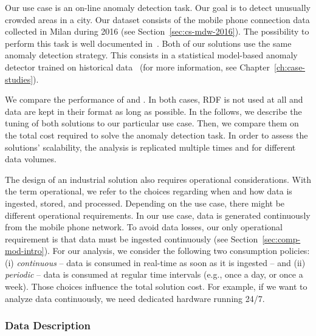 {Our use case is an on-line anomaly detection task. Our goal is to detect unusually crowded areas in a city. Our dataset consists of the mobile phone connection data collected in Milan during 2016 (see Section~\ref{sec:cs-mdw-2016}). The possibility to perform this task is well documented in~\cite{krings2009urban,calabrese2010geography,calabrese2011real}. Both of our solutions use the same anomaly detection strategy. This consists in a statistical model-based anomaly detector trained on historical data~\cite{DBLP:journals/ieeemm/BalduiniVALAC15} (for more information, see Chapter~\ref{ch:case-studies}). 

We compare the performance of \sparkdi{} and \sti{}.
In both cases, RDF is not used at all and data are kept in their format as long as possible.
In the follows, we describe the tuning of both solutions to our particular use case. Then, we compare them on the total cost required to solve the anomaly detection task. In order to assess the solutions' scalability, the analysis is replicated multiple times and for different data volumes.

The design of an industrial solution also requires operational considerations. With the term operational, we refer to the choices regarding when and how data is ingested, stored, and processed. Depending on the use case, there might be different operational requirements. In our use case, data is generated continuously from the mobile phone network. To avoid data losses, our only operational requirement is that data must be ingested continuously (see Section~\ref{sec:comp-mod-intro}). For our analysis, we consider the following two consumption policies: (i) \textit{continuous} -- data is consumed in real-time as soon as it is ingested -- and (ii) \textit{periodic} -- data is consumed at regular time intervals (e.g., once a day, or  once a week). Those choices influence the total solution cost. For example, if we want to analyze data continuously, we need dedicated hardware running 24/7.

\subsubsection{Data Description}
\label{sec:desc}

}
